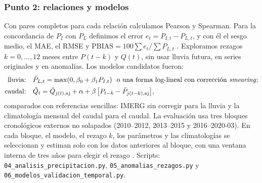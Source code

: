 \documentclass[11pt,a4paper]{article}
\newcommand{\archivo}[1]{\nolinkurl{#1}}
\newcommand{\PL}{P_L}
\newcommand{\PI}{P_I}
\newcommand{\Qm}{Q}
\begin{document}
\subsubsection{Punto 2: relaciones y modelos}
Con pares completos para cada relación calculamos Pearson y Spearman. Para la concordancia de $\PI$ con $\PL$ definimos el error $e_t=P_{I,t}-P_{L,t}$, y con él el sesgo medio, el MAE, el RMSE y $\mathrm{PBIAS}=100\sum e_t/\sum P_{L,t}$ \citep{Willmott1981,HossainHuffman2008,Gupta2009}. Exploramos rezagos $k=0,\ldots,12$ meses entre $P(t-k)$ y $\Qm(t)$, sin usar lluvia futura, en series originales y en anomalías. Los modelos candidatos fueron:
\begin{align}
\text{lluvia:}\quad &\hat P_{L,t}=\max(0,\beta_0+\beta_1P_{I,t}) \ \ \text{o una forma log-lineal con corrección \emph{smearing}};\\
\text{caudal:}\quad &\hat Q_t=\bar Q_{j(t),\mathrm{aj}}+\alpha+\beta\,\big[P_{t-k}-\bar P_{j(t-k),\mathrm{aj}}\big],
\label{eq:modeloq}
\end{align}
comparados con referencias sencillas: IMERG sin corregir para la lluvia y la climatología mensual del caudal para el caudal. La evaluación usa tres bloques cronológicos externos no solapados (2010--2012, 2013--2015 y 2016--2020-03). En cada bloque, el modelo, el rezago $k$, los parámetros y las climatologías se seleccionan y estiman solo con los datos anteriores al bloque, con una ventana interna de tres años para elegir el rezago \citep{Klemes1986,Roberts2017,Bergmeir2018}. Scripts: \archivo{04_analisis_precipitacion.py}, \archivo{05_anomalias_rezagos.py} y \archivo{06_modelos_validacion_temporal.py}.
\end{document}
